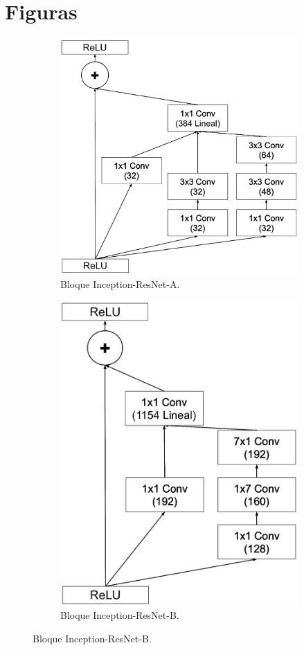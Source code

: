 \chapter{Figuras} \label{Appendix:Figures}


\begin{figure}
    \centering
    \begin{subfigure}[t]{.45\textwidth}
      \centering
      \includegraphics[width=.8\linewidth]{Images/Inception-ResNet-A.png}
      \caption{Bloque Inception-ResNet-A.}
      \label{fig:Inception-ResNet-A}
    \end{subfigure}
    \hfill
    \begin{subfigure}[t]{.45\textwidth}
      \centering
      \includegraphics[width=.8\linewidth]{Images/Inception-ResNet-B.png}
      \caption{Bloque Inception-ResNet-B.}
      \label{fig:Inception-ResNet-B}
    \end{subfigure}
    

\end{figure}
